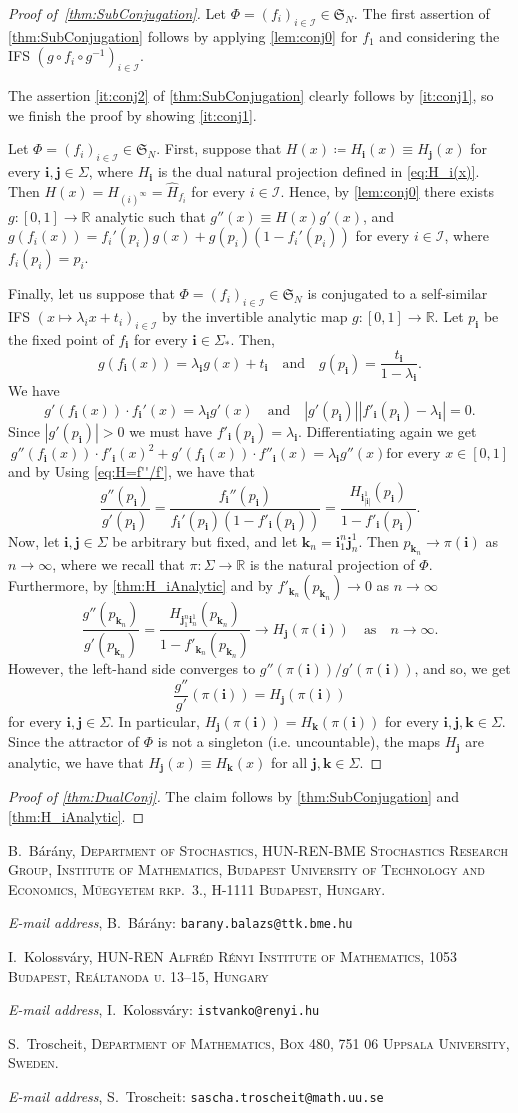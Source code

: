 \documentclass[11pt,]{article}
\makeatletter
\def\cref#1{\ref{#1}}%
\theoremstyle{definition}
\theoremstyle{remark}
\newcommand{\0}{\mathbf{0}}
\newcommand{\bi}{\mathbf{i}}
\newcommand{\bj}{\mathbf{j}}
\newcommand{\bk}{{\mathbf{k}}}
\newcommand{\Addresses}{{%
  \bigskip
  \footnotesize

  B.~B\'ar\'any, \textsc{Department of Stochastics, HUN-REN-BME Stochastics Research Group,
  Institute of Mathematics, Budapest University of Technology and Economics, M\H{u}egyetem rkp.~3.,
H-1111 Budapest, Hungary.}\par\nopagebreak
  \textit{E-mail address}, B.~B\'ar\'any: \texttt{barany.balazs@ttk.bme.hu}

  \medskip

  I.~Kolossv\'ary, \textsc{HUN-REN Alfr\'ed R\'enyi Institute of Mathematics, 1053 Budapest, Re\'altanoda u.
13–15, Hungary}\par\nopagebreak
  \textit{E-mail address}, I.~Kolossv\'ary: \texttt{istvanko@renyi.hu}
   \medskip


  S.~Troscheit, \textsc{Department of Mathematics, Box 480, 751 06 Uppsala University, Sweden.}\par\nopagebreak
  \textit{E-mail address}, S.~Troscheit: \texttt{sascha.troscheit@math.uu.se}
}}
\makeatother
\begin{document}
\begin{proof}[Proof of~\cref{thm:SubConjugation}]
	Let $\Phi=(f_i)_{i\in\mathcal{I}}\in\mathfrak{S}_N$. The first assertion of
	\cref{thm:SubConjugation} follows by applying \cref{lem:conj0} for $f_1$ and considering the
	IFS $(g\circ f_i\circ g^{-1})_{i\in\mathcal{I}}$.
	
	The assertion \cref{it:conj2} of \cref{thm:SubConjugation} clearly follows by
	\cref{it:conj1}, so we finish the proof by showing \cref{it:conj1}.
	
	Let $\Phi=(f_i)_{i\in\mathcal{I}}\in\mathfrak{S}_N$. First, suppose that $H(x)\coloneqq
	H_{\bi}(x)\equiv H_{\bj}(x)$ for every $\bi,\bj\in\Sigma$, where $H_{\bi}$ is the dual
	natural projection defined in \cref{eq:H_i(x)}. Then $H(x)=H_{(i)^{\infty}}=\hat{H}_{f_i}$
	for every $i\in\mathcal{I}$. Hence, by \cref{lem:conj0} there exists
	$g\colon[0,1]\to\mathbb{R}$ analytic such that $g''(x)\equiv H(x)g'(x)$, and
	$g(f_i(x))=f_i'(p_i)g(x)+g(p_i)(1-f_i'(p_i))$ for every $i\in\mathcal{I}$, where
	$f_i(p_i)=p_i$.
	
	Finally, let us suppose that $\Phi=(f_i)_{i\in\mathcal{I}}\in\mathfrak{S}_N$ is conjugated
	to a self-similar IFS $(x\mapsto \lambda_ix+t_i)_{i\in\mathcal{I}}$ by the invertible
	analytic map $g\colon[0,1]\to\mathbb{R}$. Let $p_{\bi}$ be the fixed point of $f_{\bi}$ for
	every $\bi\in\Sigma_*$. 
	Then,
\[
g(f_{\bi}(x)) = \lambda_{\bi} g(x) + t_{\bi}
\quad\text{and}\quad
g(p_{\bi}) = \frac{t_{\bi}}{1-\lambda_{\bi}}.
\]
We have
\[
g'(f_{\bi}(x))\cdot f_{\bi}'(x) = \lambda_{\bi} g'(x)
\quad\text{and}\quad
|g'(p_{\bi})||f'_{\bi}(p_{\bi})-\lambda_{\bi}| = 0.
\]
Since $|g'(p_{\bi})|>0$ we must have $f'_{\bi}(p_{\bi}) = \lambda_{\bi}$.
Differentiating again we get
\[
g''(f_{\bi}(x))\cdot f'_{\bi}(x)^2 +g'(f_{\bi}(x))\cdot f''_{\bi}(x) = \lambda_{\bi} g''(x)\text{
for every }x\in[0,1]
\]
and by Using \cref{eq:H=f''/f'}, we have that
\[
\frac{g''(p_{\bi})}{g'(p_{\bi})} =
\frac{f_{\bi}''(p_{\bi})}{f_{\bi}'(p_{\bi})(1-f'_{\bi}(p_{\bi}))}
=\frac{H_{\bi_{|\bi|}^1}(p_{\bi})}{1-f'_{\bi}(p_{\bi})}.
\]
Now, let $\bi,\bj\in\Sigma$ be arbitrary but fixed, and let $\bk_n = \bi_1^{n} \bj_n^1$. Then
$p_{\bk_n}\to \pi(\bi)$ as $n\to\infty$, where we recall that $\pi\colon\Sigma\to\mathbb{R}$ is the
natural projection of $\Phi$. Furthermore, by \cref{thm:H_iAnalytic} and by
$f'_{\bk_n}(p_{\bk_n})\to0$ as $n\to\infty$
\[
\frac{g''(p_{\bk_n})}{g'(p_{\bk_n})}
=\frac{H_{\bj_1^n \bi_n^1}(p_{\bk_n})}{1-f'_{\bk_n}(p_{\bk_n})}
\to
H_{\bj}(\pi(\bi))\quad \text{as}\quad n\to\infty.
\]
However, the left-hand side converges to $g''(\pi(\bi))/g'(\pi(\bi))$, and so, we get 
$$
\frac{g''}{g'}(\pi(\bi))=H_{\bj}(\pi(\bi))
$$
for every $\bi,\bj\in\Sigma$. In particular, $H_{\bj}(\pi(\bi))=H_{\bk}(\pi(\bi))$ for every
$\bi,\bj,\bk\in\Sigma$. Since the attractor of $\Phi$ is not a singleton (i.e. uncountable), the
maps $H_{\bj}$ are analytic, we have that $H_{\bj}(x)\equiv H_{\bk}(x)$ for all $\bj,\bk\in \Sigma$.
\end{proof}

\begin{proof}[Proof of \cref{thm:DualConj}]
	The claim follows by \cref{thm:SubConjugation} and \cref{thm:H_iAnalytic}.
\end{proof}






\Addresses
\end{document}
